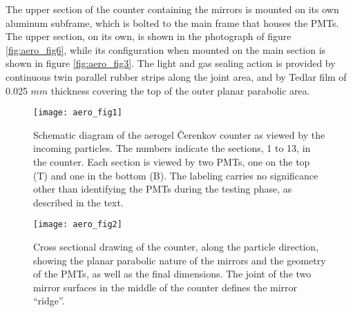 The upper section of the counter containing the mirrors is mounted on its
own aluminum subframe, which is bolted to the main frame that houses the PMTs. 
The upper section, on its own, is shown in the photograph of
figure \ref{fig:aero_fig6}, while
its configuration when mounted on the main section is shown in
figure \ref{fig:aero_fig3}.  The
light and gas sealing action is provided by continuous twin parallel rubber
strips along the joint area, and by Tedlar film of 0.025 $mm$ thickness
covering the top of the outer planar parabolic area. 
\begin{figure}[p]
\texttt{[image: aero\_fig1]}
\caption{
 Schematic diagram of the aerogel \v{C}erenkov counter as viewed by the
 incoming particles.  The numbers indicate the sections, 1 to 13, in the
 counter. Each section is viewed by two PMTs, one on the top (T) and one in the
 bottom (B). The labeling carries no significance other than identifying the
 PMTs during the testing phase, as described in the text.
 }
\label{fig:aero_fig1}
\end{figure}

\begin{figure}[tbh]
\texttt{[image: aero\_fig2]}
\caption{
 Cross sectional drawing of the counter, along the particle direction, 
 showing the planar parabolic nature of the mirrors and the geometry of the 
 PMTs, as well as the final dimensions.  The joint of the two mirror surfaces in
 the middle of the counter defines the mirror ``ridge''.
 }
\label{fig:aero_fig2}
\end{figure}

